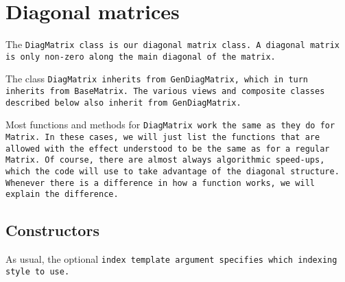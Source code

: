 
\section{Diagonal matrices}
\label{DiagMatrix}

The \tt{DiagMatrix} class is our diagonal matrix class.  
A diagonal matrix is only non-zero
along the main diagonal of the matrix.  

The class \tt{DiagMatrix} inherits from \tt{GenDiagMatrix},
which in turn inherits from \tt{BaseMatrix}.
The various views and composite classes described below
also inherit from \tt{GenDiagMatrix}.

Most functions and methods for \tt{DiagMatrix} work the same
as they do for \tt{Matrix}.
In these cases, we will just list the functions
that are allowed with the
effect understood to be the same as for a regular \tt{Matrix}.  Of course, there are 
almost always algorithmic speed-ups, which the code will use to take advantage of the 
diagonal structure.
Whenever there is a difference in how a function works,
we will explain the difference.

\subsection{Constructors}
\label{DiagMatrix_Constructors}

As usual, the optional \tt{index} template argument specifies which indexing
style to use.

